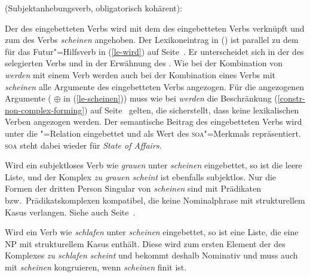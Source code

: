{\eas
\label{le-scheinen}
 (Subjektanhebungsverb, obligatorisch kohärent):\\
\zs

\noindent
Der \subjw des eingebetteten Verbs  wird mit dem \compsw des
eingebetteten Verbs  verknüpft und zum \compsw des Verbs \emph{scheinen} angehoben.
Der Lexikoneintrag in () ist parallel zu dem für das Futur"=Hilfsverb in (\ref{le-wird})
auf Seite~\pageref{le-wird}. Er unterscheidet sich in der \vform des selegierten Verbs und in der Erwähnung des \subjms.
Wie bei der Kombination von \emph{werden} mit einem Verb werden auch bei der Kombination
eines Verbs mit \emph{scheinen} alle Argumente des eingebetteten Verbs angezogen.
Für die angezogenen Argumente ( $\oplus$  in (\ref{le-scheinen})) muss wie bei \emph{werden}
die Beschränkung (\ref{constr-non-complex-forming}) auf Seite~\pageref{constr-non-complex-forming} gelten,
die sicherstellt, dass keine lexikalischen Verben angezogen werden.
Der semantische Beitrag des eingebetteten Verbs wird unter die "=Relation eingebettet
und als Wert des \textsc{soa}"=Merkmals repräsentiert. \textsc{soa} steht dabei wieder für \emph{State of Affairs}.

Wird ein subjektloses Verb wie \emph{grauen} unter \emph{scheinen} eingebettet, so
ist  die leere Liste, und der Komplex \emph{zu grauen scheint} ist ebenfalls
subjektlos. Nur die Formen der dritten Person Singular von \emph{scheinen}
sind mit Prädikaten bzw.\ Prädikatskomplexen kompatibel, 
die keine Nominalphrase mit strukturellem Kasus verlangen. Siehe auch Seite~\pageref{page-kongruenz-scheinen}.

Wird ein Verb wie \emph{schlafen} unter \emph{scheinen} eingebettet, so ist
 eine Liste, die eine NP mit strukturellem Kasus enthält. Diese wird
zum ersten Element der \compsl des Komplexes \emph{zu schlafen scheint} und bekommt
deshalb Nominativ und muss auch mit \emph{scheinen} kongruieren,
wenn \emph{scheinen} finit ist.

}
